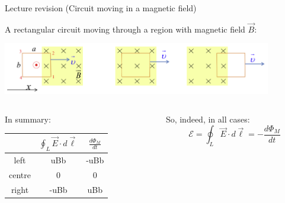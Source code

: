 %
%
%

\begin{frame}{Lecture \summarizedlecture revision  (Circuit moving in a magnetic field)}

A rectangular circuit moving through a region with magnetic field $\vec{B}$:
\begin{center}
  \includegraphics[width=0.88\textwidth]{./images/schematics/circuit_moving_through_magnetic_field_all_3.png}
\end{center}

\begin{columns}
  \begin{column}{0.55\textwidth}
  In summary:
  {\small
    \setlength{\extrarowheight}{10pt}
    \setlength{\arraycolsep}{5pt}
    \begin{table}[H]
        \begin{tabular}{|c||c|c|}
        \hline
               & $\displaystyle \oint_{L} \vec{E} \cdot d\vec{\ell}$ & $\displaystyle \frac{d\Phi_{M}}{dt}$\\
        \hline
          left   &  uBb &  -uBb \\
          centre & 0    &  0   \\
          right  &  -uBb & uBb \\
        \hline
        \end{tabular}
    \end{table}
  }
  \end{column}
  \begin{column}{0.45\textwidth}
     So, indeed, in all cases:
     \begin{equation*}
       \mathcal{E} = \oint_{L} \vec{E} \cdot d\vec{\ell} = - \frac{d\Phi_{M}}{dt}
     \end{equation*}
  \end{column}
\end{columns}

\end{frame}

%
%
%

